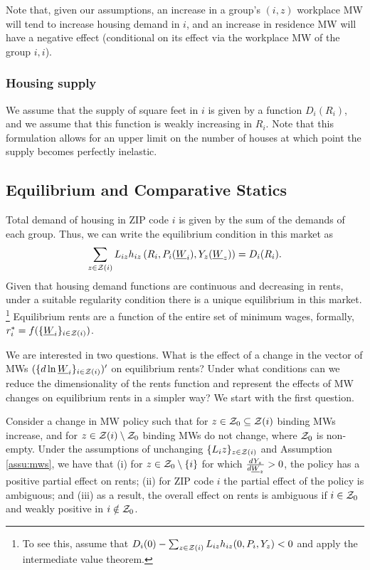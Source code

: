 Note that, given our assumptions, an increase in a group's $(i,z)$ workplace MW 
will tend to increase housing demand in $i$, and an increase in residence MW
will have a negative effect (conditional on its effect via the workplace MW
of the group $i,i$).


\subsubsection*{Housing supply}

We assume that the supply of square feet in $i$ is given by a function $D_i(R_i)$,
and we assume that this function is weakly increasing in $R_i$.
Note that this formulation allows for an upper limit on the number of houses at 
which point the supply becomes perfectly inelastic.

\subsection{Equilibrium and Comparative Statics}

Total demand of housing in ZIP code $i$ is given by the sum of the demands of 
each group.
Thus, we can write the equilibrium condition in this market as
\begin{equation}\label{eq:equilibrium}
	\sum_{z\in\mathcal{Z}(i)} L_{iz} h_{iz} \left(R_i, P_i(\underline{W}_i), Y_z(\underline{W}_z)\right) = D_i(R_i) .
\end{equation}
Given that housing demand functions are continuous and decreasing in rents, 
under a suitable regularity condition there is a unique equilibrium in this market.%
\footnote{To see this, assume that 
$D_i(0) - \sum_{z\in\mathcal{Z}(i)} L_{iz} h_{iz} (0, P_i, Y_z) < 0$
and apply the intermediate value theorem.}
Equilibrium rents are a function of the entire set of minimum wages, formally, 
$r^*_i = f(\{\underline{W}_i\}_{i\in\mathcal{Z}(i)})$.

We are interested in two questions.
What is the effect of a change in the vector of MWs $(\{d \ln \underline{W}_i\}_{i\in\mathcal{Z}(i)})'$
on equilibrium rents?
Under what conditions can we reduce the dimensionality of the rents function and 
represent the effects of MW changes on equilibrium rents in a simpler way?
We start with the first question.

\begin{prop}\label{prop:comparative_statics}
    Consider a change in MW policy such that 
    for $z\in\mathcal{Z}_0 \subseteq \mathcal{Z}(i)$ binding MWs increase, 
    and for $z\in\mathcal{Z}(i)\setminus \mathcal{Z}_0$ binding MWs do not change,
    where $\mathcal{Z}_0$ is non-empty.
    Under the assumptions of unchanging $\{L_iz\}_{z\in\mathcal{Z}(i)}$ 
    and Assumption \ref{assu:mws},
    we have that
    (i) for $z\in\mathcal{Z}_0\setminus\{i\}$ for which $\frac{d Y_z}{d \underline{W}_z}>0$, 
    the policy has a positive partial effect on rents;
    (ii) for ZIP code $i$ the partial effect of the policy is ambiguous; and
    (iii) as a result, the overall effect on rents is ambiguous if $i\in\mathcal{Z}_0$ 
    and weakly positive in $i\notin\mathcal{Z}_0$.
\end{prop}

